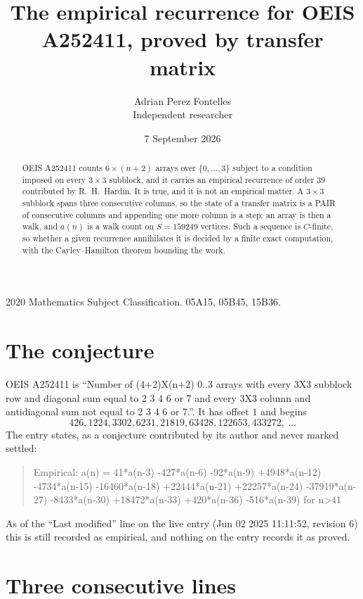 \documentclass[11pt,a4paper]{article}
\title{The empirical recurrence for OEIS A252411, proved by transfer matrix}
\author{Adrian Perez Fontelles\\ \small Independent researcher}
\date{7 September 2026}
\theoremstyle{plain}
\theoremstyle{definition}
\begin{document}
\maketitle

\begin{abstract}
OEIS A252411 counts $6\times(n+2)$ arrays over $\{0,\dots,3\}$ subject to a condition imposed on
every $3\times3$ subblock, and it carries an empirical recurrence of order $39$
contributed by R.~H.~Hardin. It is true, and it is not an empirical matter. A $3\times3$
subblock spans three consecutive columns, so the state of a transfer matrix is a PAIR of
consecutive columns and appending one more column is a step; an array is then a walk, and
$a(n)$ is a walk count on $S=159249$ vertices. Such a sequence is $C$-finite, so whether a given
recurrence annihilates it is decided by a finite exact computation, with the Cayley--Hamilton
theorem bounding the work.
\end{abstract}

\noindent\small 2020 Mathematics Subject Classification. 05A15, 05B45, 15B36.\normalsize

\section{The conjecture}

OEIS A252411 is ``Number of (4+2)X(n+2) 0..3 arrays with every 3X3 subblock row and diagonal sum equal to 2 3 4 6 or 7 and every 3X3 column and antidiagonal sum not equal to 2 3 4 6 or 7.''. It has offset $1$ and begins
\[
426, 1224, 3302, 6231, 21819, 63428, 122653, 433272,\ \dots
\]
The entry states, as a conjecture contributed by its author and never marked settled:
\begin{quote}
Empirical: a(n) = 41*a(n-3) -427*a(n-6) -92*a(n-9) +4948*a(n-12) -4734*a(n-15) -16460*a(n-18) +22444*a(n-21) +22257*a(n-24) -37919*a(n-27) -8433*a(n-30) +18472*a(n-33) +420*a(n-36) -516*a(n-39) for n>41
\end{quote}
As of the ``Last modified'' line on the live entry (Jun 02 2025 11:11:52, revision 6) this is still
recorded as empirical, and nothing on the entry records it as proved.

\section{Three consecutive lines}
\end{document}
